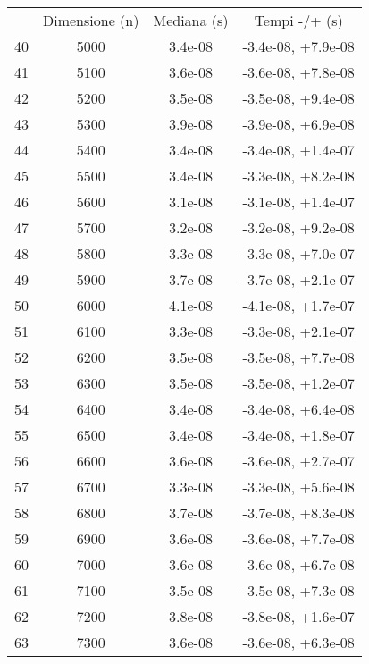 \begin{table}
\centering
\begin{adjustbox}{width=1\textwidth/2}
\begin{tabular}{|c|c|c|c|}
\hline
 & Dimensione (n) & Mediana (s) & Tempi -/+ (s) \\
40 & 5000 & 3.4e-08 & -3.4e-08, +7.9e-08 \\
\cline{1-4}
41 & 5100 & 3.6e-08 & -3.6e-08, +7.8e-08 \\
\cline{1-4}
42 & 5200 & 3.5e-08 & -3.5e-08, +9.4e-08 \\
\cline{1-4}
43 & 5300 & 3.9e-08 & -3.9e-08, +6.9e-08 \\
\cline{1-4}
44 & 5400 & 3.4e-08 & -3.4e-08, +1.4e-07 \\
\cline{1-4}
45 & 5500 & 3.4e-08 & -3.3e-08, +8.2e-08 \\
\cline{1-4}
46 & 5600 & 3.1e-08 & -3.1e-08, +1.4e-07 \\
\cline{1-4}
47 & 5700 & 3.2e-08 & -3.2e-08, +9.2e-08 \\
\cline{1-4}
48 & 5800 & 3.3e-08 & -3.3e-08, +7.0e-07 \\
\cline{1-4}
49 & 5900 & 3.7e-08 & -3.7e-08, +2.1e-07 \\
\cline{1-4}
50 & 6000 & 4.1e-08 & -4.1e-08, +1.7e-07 \\
\cline{1-4}
51 & 6100 & 3.3e-08 & -3.3e-08, +2.1e-07 \\
\cline{1-4}
52 & 6200 & 3.5e-08 & -3.5e-08, +7.7e-08 \\
\cline{1-4}
53 & 6300 & 3.5e-08 & -3.5e-08, +1.2e-07 \\
\cline{1-4}
54 & 6400 & 3.4e-08 & -3.4e-08, +6.4e-08 \\
\cline{1-4}
55 & 6500 & 3.4e-08 & -3.4e-08, +1.8e-07 \\
\cline{1-4}
56 & 6600 & 3.6e-08 & -3.6e-08, +2.7e-07 \\
\cline{1-4}
57 & 6700 & 3.3e-08 & -3.3e-08, +5.6e-08 \\
\cline{1-4}
58 & 6800 & 3.7e-08 & -3.7e-08, +8.3e-08 \\
\cline{1-4}
59 & 6900 & 3.6e-08 & -3.6e-08, +7.7e-08 \\
\cline{1-4}
60 & 7000 & 3.6e-08 & -3.6e-08, +6.7e-08 \\
\cline{1-4}
61 & 7100 & 3.5e-08 & -3.5e-08, +7.3e-08 \\
\cline{1-4}
62 & 7200 & 3.8e-08 & -3.8e-08, +1.6e-07 \\
\cline{1-4}
63 & 7300 & 3.6e-08 & -3.6e-08, +6.3e-08 \\

\end{tabular}
\end{adjustbox}
\end{table}
